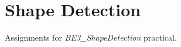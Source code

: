 
\section{Shape Detection}
\label{sec:shape_detection}

Assignments for \textit{BE3\_ShapeDetection} practical.